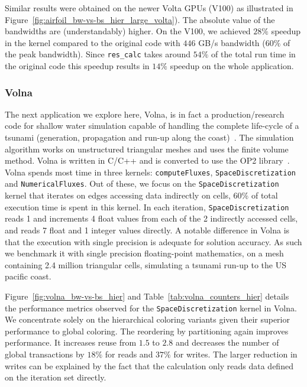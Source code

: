 Similar results were obtained on the newer Volta GPUs (V100) as illustrated in 
Figure~\ref{fig:airfoil_bw-vs-bs_hier_large_volta}). The absolute value of the
bandwidths are (understandably) higher. On the V100, we achieved $28\%$ 
speedup in the kernel compared to the original code with $446$ GB/s bandwidth 
($60\%$ of the peak bandwidth). Since \texttt{res\_calc} takes around $54\%$ of 
the total run time in the original code this speedup results in $14\%$ 
speedup on the whole application.


\subsubsection{Volna}
\noindent The next application we explore here, Volna, is in fact a 
production/research code for shallow water simulation capable of handling the 
complete life-cycle of a tsunami (generation, propagation and run-up along the 
coast)~\cite{dutykh2011volna}. The simulation algorithm works on unstructured
triangular meshes and uses the finite volume method. Volna is written in C/C++
and is converted to use the OP2 library~\cite{op2-volna2018}. Volna spends 
most time in three kernels: \texttt{computeFluxes}, \texttt{SpaceDiscretization} 
and \texttt{NumericalFluxes}. Out of these, we focus on the 
\texttt{SpaceDiscretization} kernel that iterates on edges accessing data 
indirectly on cells, 60\% of total execution time is spent in this kernel. In 
each iteration, \texttt{SpaceDiscretization} reads 1 and increments 4 float 
values from each of the 2 indirectly accessed cells, and reads 7 float and 1 
integer values directly. A notable difference in Volna is that the execution 
with single precision is adequate for solution accuracy. As such we benchmark it 
with single precision floating-point mathematics, on a mesh containing 2.4 
million triangular cells, simulating a tsunami run-up to the US pacific coast. 

Figure~\ref{fig:volna_bw-vs-bs_hier} and Table~\ref{tab:volna_counters_hier} 
details the performance metrics observed for the \texttt{SpaceDiscretization} 
kernel in Volna. We concentrate solely on the hierarchical coloring variants 
given their superior performance to global coloring. The reordering by 
partitioning again improves performance. It increases reuse from $1.5$ to 
$2.8$ and decreases the number of global transactions by $18\%$ for reads and 
$37\%$ for writes. The larger reduction in writes can be explained by the fact 
that the calculation only reads data defined on the iteration set directly.

